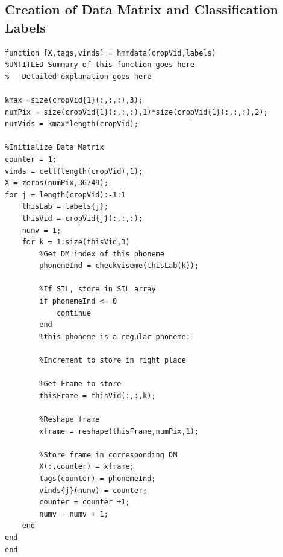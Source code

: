 \documentclass[a4paper]{article}
\begin{document}
\subsection{Creation of Data Matrix and Classification Labels}
\begin{lstlisting}[style=myMatlabstyle]
function [X,tags,vinds] = hmmdata(cropVid,labels)
%UNTITLED Summary of this function goes here
%   Detailed explanation goes here

kmax =size(cropVid{1}(:,:,:),3);
numPix = size(cropVid{1}(:,:,:),1)*size(cropVid{1}(:,:,:),2);
numVids = kmax*length(cropVid);

%Initialize Data Matrix
counter = 1;
vinds = cell(length(cropVid),1);
X = zeros(numPix,36749);
for j = length(cropVid):-1:1
    thisLab = labels{j};
    thisVid = cropVid{j}(:,:,:);
    numv = 1;
    for k = 1:size(thisVid,3)
        %Get DM index of this phoneme
        phonemeInd = checkviseme(thisLab(k));
        
        %If SIL, store in SIL array
        if phonemeInd <= 0
            continue
        end
        %this phoneme is a regular phoneme:
        
        %Increment to store in right place
        
        %Get Frame to store
        thisFrame = thisVid(:,:,k);
        
        %Reshape frame
        xframe = reshape(thisFrame,numPix,1);
        
        %Store frame in corresponding DM
        X(:,counter) = xframe;
        tags(counter) = phonemeInd;
        vinds{j}(numv) = counter;
        counter = counter +1;
        numv = numv + 1;
    end
end
end
\end{lstlisting}
\end{document}
